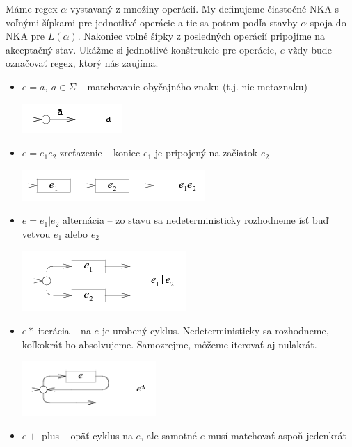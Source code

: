 Máme regex $\alpha$ vystavaný z množiny operácií. My definujeme čiastočné NKA s voľnými šípkami pre jednotlivé operácie a tie sa potom podľa stavby $\alpha$ spoja do NKA pre $L(\alpha )$. Nakoniec voľné šípky z posledných operácií pripojíme na akceptačný stav. Ukážme si jednotlivé konštrukcie pre operácie, $e$ vždy bude označovať regex, ktorý nás zaujíma.
\begin{itemize}
\item $e=a,~a\in \Sigma$ -- matchovanie obyčajného znaku (t.j. nie metaznaku)
\begin{center}
	 \includegraphics[scale=1]{obrazky/T_pismenko}
\end{center}
\item $e = e_1e_2$ zreťazenie -- koniec $e_1$ je pripojený na začiatok $e_2$
\begin{center}
    \includegraphics[scale=1]{obrazky/T_zretazenie}
\end{center} 
\item $e=e_1|e_2$ alternácia -- zo stavu sa nedeterministicky rozhodneme ísť buď vetvou $e_1$ alebo $e_2$
\begin{center}
    \includegraphics[scale = 1]{obrazky/T_alternacia}
\end{center}
\item $e*$ iterácia -- na $e$ je urobený cyklus. Nedeterministicky sa rozhodneme, koľkokrát ho absolvujeme. Samozrejme, môžeme iterovať aj nulakrát.
\begin{center}
    \includegraphics[width=0.40\textwidth]{obrazky/T_iteracia}
\end{center}
\item $e+$ plus -- opäť cyklus na $e$, ale samotné $e$ musí matchovať aspoň jedenkrát

\end{itemize}

